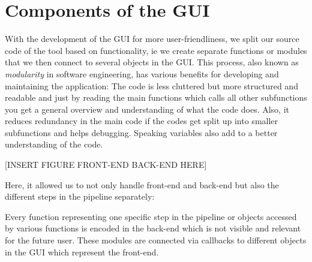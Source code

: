 \section{Components of the GUI}

With the development of the GUI for more user-friendliness, we split our source code of the tool based on functionality, ie we create separate functions or modules that we then connect to several objects in the GUI. This process, also known as \textit{modularity} in software engineering, has various benefits for developing and maintaining the application: The code is less cluttered but more structured and readable and just by reading the main functions which calls all other subfunctions you get a general overview and understanding of what the code does. Also, it reduces redundancy in the main code if the codes get split up into smaller subfunctions and helps debugging. Speaking variables also add to a better understanding of the code.


[INSERT FIGURE FRONT-END BACK-END HERE]


Here, it allowed us to not only handle front-end and back-end but also the different steps in the pipeline separately: 

Every function representing one specific step in the pipeline or objects accessed by various functions is encoded in the back-end which is not visible and relevant for the future user. These modules are connected via callbacks to different objects in the GUI which represent the front-end.


